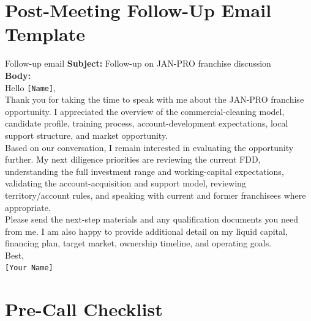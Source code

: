 \documentclass[11pt]{article}
\newcommand{\placeholder}[1]{\textcolor{accent}{\texttt{[#1]}}}
\newcommand{\janpro}{JAN-PRO}
\begin{document}
\section{Post-Meeting Follow-Up Email Template}

\begin{scriptbox}{Follow-up email}
\textbf{Subject:} Follow-up on \janpro{} franchise discussion\\[0.4em]
\textbf{Body:}\\
Hello \placeholder{Name},\\[0.25em]
Thank you for taking the time to speak with me about the \janpro{} franchise opportunity. I appreciated the overview of the commercial-cleaning model, candidate profile, training process, account-development expectations, local support structure, and market opportunity.\\[0.25em]
Based on our conversation, I remain interested in evaluating the opportunity further. My next diligence priorities are reviewing the current FDD, understanding the full investment range and working-capital expectations, validating the account-acquisition and support model, reviewing territory/account rules, and speaking with current and former franchisees where appropriate.\\[0.25em]
Please send the next-step materials and any qualification documents you need from me. I am also happy to provide additional detail on my liquid capital, financing plan, target market, ownership timeline, and operating goals.\\[0.25em]
Best,\\
\placeholder{Your Name}
\end{scriptbox}

\section{Pre-Call Checklist}
\end{document}
